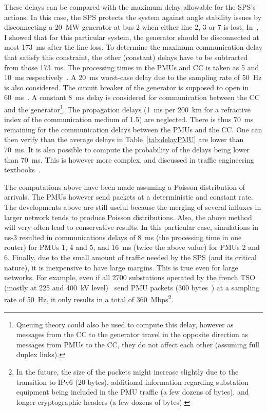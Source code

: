 These delays can be compared with the maximum delay allowable for the SPS's actions. In this case, the SPS protects the system against angle stability issues by disconnecting a 20~MW generator at bus 2 when either line 2, 3 or 7 is lost. In~\cite{LambdaMu2022}, I showed that for this particular system, the generator should be disconnected at most 173~ms after the line loss. To determine the maximum communication delay that satisfy this constraint, the other (constant) delays have to be subtracted from those 173~ms. The processing times in the PMUs and CC is taken as 5 and 10~ms respectively~\cite{SPS-Ciapessoni}. A 20~ms worst-case delay due to the sampling rate of 50~Hz is also considered. The circuit breaker of the generator is supposed to open in 60~ms~\cite{ESOcircuitBreakerDelay}. A constant 8~ms delay is considered for communication between the CC and the generator\footnote{Queuing theory could also be used to compute this delay, however as messages from the CC to the generator travel in the opposite direction as messages from PMUs to the CC, they do not affect each other (assuming full duplex links).}. The propagation delays (1~ms per 200~km for a refractive index of the communication medium of 1.5) are neglected. There is thus 70~ms remaining for the communication delays between the PMUs and the CC. One can then verify than the average delays in Table~\ref{tab:delayPMU} are lower than 70~ms. It is also possible to compute the probability of the delays being lower than 70~ms. This is however more complex, and discussed in traffic engineering textbooks~\cite{trafficBook}.

The computations above have been made assuming a Poisson distribution of arrivals. The PMUs however send packets at a deterministic and constant rate. The developments above are still useful because the merging of several influxes in larger network tends to produce Poisson distributions. Also, the above method will very often lead to conservative results. In this particular case, simulations in ns-3 resulted in communications delays of 8~ms (the processing time in one router) for PMUs 1, 4 and 5, and 16~ms (twice the above value) for PMUs 2 and 6. Finally, due to the small amount of traffic needed by the SPS (and its critical nature), it is inexpensive to have large margins. This is true even for large networks. For example, even if all 2700 substations operated by the french TSO (mostly at 225 and 400~kV level)~\cite{RTEsubstations} send PMU packets (300 bytes~\cite{StandardC37-118-2}) at a sampling rate of 50~Hz, it only results in a total of 360~Mbps\footnote{In the future, the size of the packets might increase slightly due to the transition to IPv6 (20 bytes), additional information regarding substation equipment being included in the PMU traffic (a few dozens of bytes), and longer cryptographic headers (a few dozens of bytes).}.

